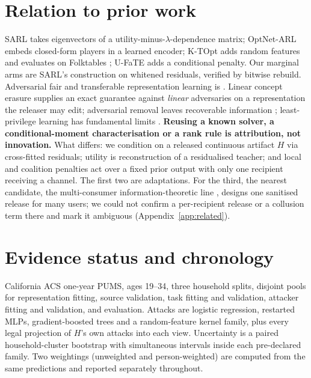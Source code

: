 \documentclass[10pt]{article}
\begin{document}
\section{Relation to prior work}
\label{sec:related}

SARL \citep{sadeghi2019sarl} takes eigenvectors of a utility-minus-$\lambda$-dependence matrix; OptNet-ARL
\citep{sadeghi2021optnetarl} embeds closed-form players in a learned encoder; K-TOpt
\citep{sadeghi2022ktopt} adds random features and evaluates on Folktables \citep{ding2021retiring}; U-FaTE
\citep{dehdashtian2024ufate} adds a conditional penalty. Our marginal arms are SARL's construction on
whitened residuals, verified by bitwise rebuild. Adversarial fair and transferable representation learning
is \citet{madras2018laftr}. Linear concept erasure \citep{belrose2023leace,holstege2025splince} supplies an
exact guarantee against \emph{linear} adversaries on a representation the releaser may edit; adversarial
removal leaves recoverable information \citep{elazar2018adversarial}; least-privilege learning has
fundamental limits \citep{stadler2024leastprivilege}. \textbf{Reusing a known solver, a conditional-moment
characterisation or a rank rule is attribution, not innovation.} What differs: we condition on a released
continuous artifact $H$ via cross-fitted residuals; utility is reconstruction of a residualised teacher;
and local and coalition penalties act over a fixed prior output with only one recipient receiving a
channel. The first two are adaptations. For the third, the nearest candidate, the multi-consumer
information-theoretic line \citep{sankar2013utility}, designs one sanitised release for many users; we could
not confirm a per-recipient release or a collusion term there and mark it ambiguous
(Appendix~\ref{app:related}).

\section{Evidence status and chronology}
\label{sec:design}

California ACS one-year PUMS, ages 19--34, three household splits, disjoint pools for representation
fitting, source validation, task fitting and validation, attacker fitting and validation, and evaluation.
Attacks are logistic regression, restarted MLPs, gradient-boosted trees and a random-feature kernel family,
plus every legal projection of $H$'s own attacks into each view. Uncertainty is a paired household-cluster
bootstrap with simultaneous intervals inside each pre-declared family. Two weightings (unweighted and
person-weighted) are computed from the same predictions and reported separately throughout.
\end{document}
